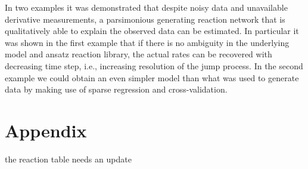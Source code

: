 \documentclass[oneside, abstracton, titlepage]{scrartcl}
\newenvironment{colbox}[1]
{\newcommand\colboxcolor{#1}%
	\begin{lrbox}{\selvestebox}%
		\begin{minipage}{\dimexpr\columnwidth-2\fboxsep\relax}}
		{\end{minipage}\end{lrbox}%
	\begin{center}
		\colorbox[HTML]{\colboxcolor}{\usebox{\selvestebox}}
\end{center}}
\begin{document}
	In two examples it was demonstrated that despite noisy data and unavailable derivative measurements, a parsimonious generating reaction network that is qualitatively able to explain the observed data can be estimated.
	In particular it was shown in the first example that if there is no ambiguity in the underlying model and ansatz reaction library, the actual rates can be recovered with decreasing time step, i.e., increasing resolution of the jump process.
	In the second example we could obtain an even simpler model than what was used to generate data by making use of sparse regression and cross-validation.

	\newpage
% 	
	
	
	\newpage	
	\section{Appendix}\label{sec:appendix}
	\begin{colbox}{F8E0E0}
		the reaction table needs an update
	\end{colbox}
\end{document}
